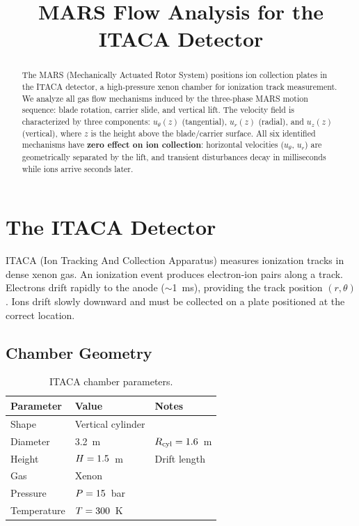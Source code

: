 \documentclass[11pt,a4paper]{article}
\title{MARS Flow Analysis for the ITACA Detector}
\author{}
\date{}
\begin{document}
\maketitle

\begin{abstract}
The MARS (Mechanically Actuated Rotor System) positions ion collection plates
in the ITACA detector, a high-pressure xenon chamber for ionization track
measurement. We analyze all gas flow mechanisms induced by the three-phase
MARS motion sequence: blade rotation, carrier slide, and vertical lift.
The velocity field is characterized by three components: $u_\theta(z)$ (tangential),
$u_r(z)$ (radial), and $u_z(z)$ (vertical), where $z$ is the height above the
blade/carrier surface. All six identified mechanisms have \textbf{zero effect
on ion collection}: horizontal velocities ($u_\theta$, $u_r$) are geometrically
separated by the lift, and transient disturbances decay in milliseconds while
ions arrive seconds later.
\end{abstract}


\section{The ITACA Detector}
\label{sec:itaca}

ITACA (Ion Tracking And Collection Apparatus) measures ionization tracks in
dense xenon gas. An ionization event produces electron-ion pairs along a track.
Electrons drift rapidly to the anode ($\sim$1~ms), providing the track position
$(r, \theta)$. Ions drift slowly downward and must be collected on a plate
positioned at the correct location.

\subsection{Chamber Geometry}

\begin{table}[H]
\centering
\caption{ITACA chamber parameters.}
\begin{tabular}{lll}
\toprule
Parameter & Value & Notes \\
\midrule
Shape & Vertical cylinder & \\
Diameter & \SI{3.2}{m} & $R_\mathrm{cyl} = 1.6$~m \\
Height & $H = 1.5$~m & Drift length \\
Gas & Xenon & \\
Pressure & $P = 15$~bar & \\
Temperature & $T = 300$~K & \\
\bottomrule
\end{tabular}
\end{table}
\end{document}
